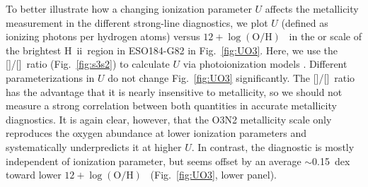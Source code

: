 \documentclass[traditabstract]{aa}
\newcommand{\hii}{\mbox{H~{\sc ii}}}
\newcommand{\oh}{12+\log(\mathrm{O/H})}
\newcommand{\sii}{[\ion{S}{ii}]}
\newcommand{\siii}{[\ion{S}{iii}]}
\begin{document}
\begin{appendix}
To better illustrate how a changing ionization parameter $U$ affects the metallicity measurement in the different strong-line diagnostics, we plot $U$ (defined as ionizing photons per hydrogen atoms) versus $\oh$~ in the \citet{2004MNRAS.348L..59P} or \citet{2016Ap&SS.361...61D} scale of the brightest \hii\  region in ESO184-G82 in Fig.~\ref{fig:UO3}. Here, we use the \sii/\siii~ratio (Fig.~\ref{fig:s3s2}) to calculate $U$ via photoionization models \citep{2011MNRAS.415.3616D}. Different parameterizations in $U$ \citep[e.g.,][]{2016A&A...594A..37M} do not change Fig.~\ref{fig:UO3} significantly. The \sii/\siii~ratio has the advantage that it is nearly insensitive to metallicity, so we should not measure a strong correlation between both quantities in accurate metallicity diagnostics. It is again clear, however, that the O3N2 metallicity scale only reproduces the oxygen abundance at lower ionization parameters and systematically underpredicts it at higher $U$. In contrast, the \citet{2016Ap&SS.361...61D} diagnostic is mostly independent of ionization parameter, but seems offset by an average $\sim$0.15~dex toward lower $\oh$~ (Fig.~\ref{fig:UO3}, lower panel).

\end{appendix}
\end{document}
